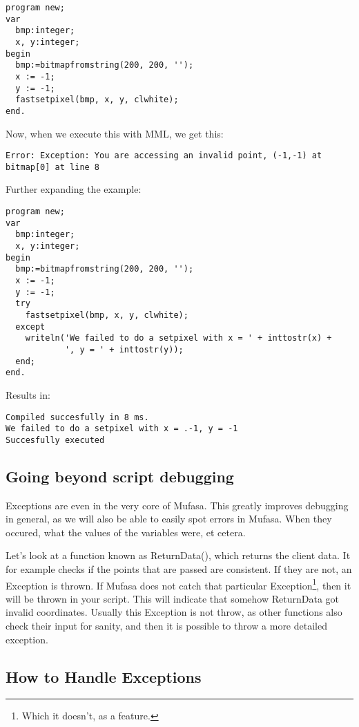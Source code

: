 \documentclass[a4paper]{report}
\begin{document}
\begin{verbatim}
program new;
var
  bmp:integer;
  x, y:integer;
begin
  bmp:=bitmapfromstring(200, 200, '');
  x := -1;
  y := -1;
  fastsetpixel(bmp, x, y, clwhite);
end.
\end{verbatim}

Now, when we execute this with MML, we get this:

\begin{verbatim}
Error: Exception: You are accessing an invalid point, (-1,-1) at bitmap[0] at line 8
\end{verbatim}

Further expanding the example:
\begin{verbatim}
program new;
var
  bmp:integer;
  x, y:integer;
begin
  bmp:=bitmapfromstring(200, 200, '');
  x := -1;
  y := -1;
  try
  	fastsetpixel(bmp, x, y, clwhite);
  except
  	writeln('We failed to do a setpixel with x = ' + inttostr(x) + 
			', y = ' + inttostr(y));
  end;
end.

\end{verbatim}

Results in:

\begin{verbatim}
Compiled succesfully in 8 ms.
We failed to do a setpixel with x = .-1, y = -1
Succesfully executed
\end{verbatim}

\subsection{Going beyond script debugging}
Exceptions are even in the very core of Mufasa. This greatly improves
debugging in general, as we will also be able to easily spot errors in Mufasa.
When they occured, what the values of the variables were, et cetera.

Let's look at a function known as ReturnData(), which returns the client data.
It for example checks if the points that are passed are consistent.
If they are not, an Exception is thrown. If Mufasa does not catch that 
particular Exception\footnote{Which it doesn't, as a feature.}, then it will
be thrown in your script. This will indicate that somehow ReturnData got
invalid coordinates. Usually this Exception is not throw, as other functions
also check their input for sanity, and then it is possible to throw a more
detailed exception.

\subsection{How to Handle Exceptions}
\end{document}
